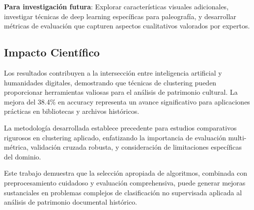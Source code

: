\documentclass[12pt,a4paper]{article}
\begin{document}
\textbf{Para investigación futura}: Explorar características visuales adicionales, investigar técnicas de deep learning específicas para paleografía, y desarrollar métricas de evaluación que capturen aspectos cualitativos valorados por expertos.

\subsection{Impacto Científico}

Los resultados contribuyen a la intersección entre inteligencia artificial y humanidades digitales, demostrando que técnicas de clustering pueden proporcionar herramientas valiosas para el análisis de patrimonio cultural. La mejora del 38.4\% en accuracy representa un avance significativo para aplicaciones prácticas en bibliotecas y archivos históricos.

La metodología desarrollada establece precedente para estudios comparativos rigurosos en clustering aplicado, enfatizando la importancia de evaluación multi-métrica, validación cruzada robusta, y consideración de limitaciones específicas del dominio.

Este trabajo demuestra que la selección apropiada de algoritmos, combinada con preprocesamiento cuidadoso y evaluación comprehensiva, puede generar mejoras sustanciales en problemas complejos de clasificación no supervisada aplicada al análisis de patrimonio documental histórico.



\end{document}
